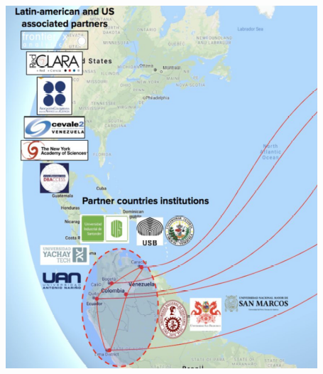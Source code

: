 \begin{frame}[fragile]
\begin{columns}[c]
\begin{center}
\includegraphics[scale=0.5]{imagenes/mapaColab_1.png}
\end{center}

\end{columns}
\end{frame}


